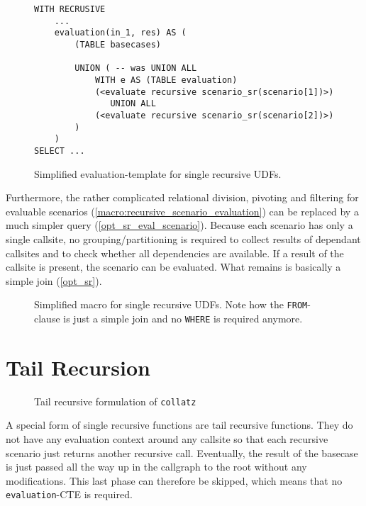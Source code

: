 \begin{figure}[h!]
    \centering
    \begin{verbatim}
WITH RECRUSIVE
    ...
    evaluation(in_1, res) AS (
        (TABLE basecases)
        
        UNION ( -- was UNION ALL
            WITH e AS (TABLE evaluation)
            (<evaluate recursive scenario_sr(scenario[1])>)
               UNION ALL
            (<evaluate recursive scenario_sr(scenario[2])>)
        )
    )
SELECT ...
    \end{verbatim}
    \caption{Simplified evaluation-template for single recursive UDFs.}
    \label{opt_sr_evaluation_cte}
\end{figure}

Furthermore, the rather complicated relational division, pivoting and filtering for evaluable scenarios (\autoref{macro:recursive_scenario_evaluation}) can be replaced by a much simpler query (\autoref{opt_sr_eval_scenario}). Because each scenario has only a single callsite, no grouping/partitioning is required to collect results of dependant callsites and to check whether all dependencies are available. If a result of the callsite is present, the scenario can be evaluated. What remains is basically a simple join (\autoref{opt_sr}).

\begin{figure}[h!]
    \centering
    \caption{Simplified macro for single recursive UDFs. Note how the \texttt{FROM}-clause is just a simple join and no \texttt{WHERE} is required anymore.}
    \label{opt_sr_eval_scenario}
\end{figure}





\section{Tail Recursion}
\begin{wrapfigure}{r}{0.5\textwidth}
  \vspace{-10pt}
  \caption{Tail recursive formulation of \texttt{collatz}}
  \label{lst:fib_tr}
\end{wrapfigure}

A special form of single recursive functions are tail recursive functions. They do not have any evaluation context around any callsite so that each recursive scenario just returns another recursive call. Eventually, the result of the basecase is just passed all the way up in the callgraph to the root without any modifications. This last phase can therefore be skipped, which means that no \texttt{evaluation}-CTE is required.


